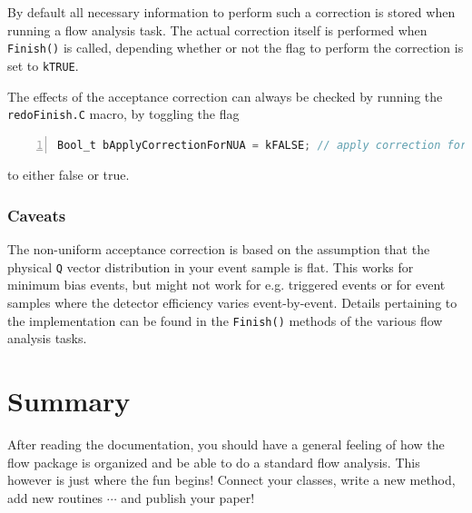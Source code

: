 \documentclass[a4paper]{book}
\numberwithin{equation}{subsection}
\begin{document}
By default all necessary information to perform such a correction is stored when running a flow analysis task. The actual correction itself is performed when 
\texttt{Finish()} is called, depending whether or not the flag to perform the correction is set to \texttt{kTRUE}.

The effects of the acceptance correction can always be checked by running the \texttt{redoFinish.C} macro, by toggling the flag
\begin{lstlisting}[language=C, numbers=left]
Bool_t bApplyCorrectionForNUA = kFALSE; // apply correction for non-uniform acceptance\end{lstlisting}
to either false or true.
\subsection{Caveats}
The non-uniform acceptance correction is based on the assumption that the physical \texttt{Q} vector distribution in your event sample is flat. This works for minimum bias events, but might not work for e.g. triggered events or for event samples where the detector efficiency varies event-by-event. Details pertaining to the implementation can be found in the \texttt{Finish()} methods of the various flow analysis tasks.

\chapter{Summary}
After reading the documentation, you should have a general feeling of how the flow package is organized and be able to do a standard flow analysis. This however is just where the fun begins! Connect your classes, write a new method, add new routines $\cdots$ and publish your paper!
\end{document}
